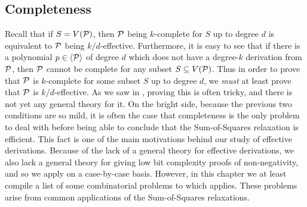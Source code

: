 \subsection{Completeness}
Recall that if $S = V(\mathcal P)$, then $\mathcal P$ being $k$-complete for $S$ up to degree $d$ is equivalent to $\mathcal P$ being $k/d$-effective. Furthermore, it is easy to see that if there is a polynomial $p \in \langle \mathcal P \rangle$ of degree $d$ which does not have a degree-$k$ derivation from $\mathcal P$, then $\mathcal P$ cannot be complete for any subset $S \subseteq V(\mathcal P)$. Thus in order to prove that $\mathcal P$ is $k$-complete for some subset $S$ up to degree $d$, we \emph{must} at least prove that $\mathcal P$ is $k/d$-effective. As we saw in , proving this is often tricky, and there is not yet any general theory for it. On the bright side, because the previous two conditions are so mild, it is often the case that completeness is the only problem to deal with before being able to conclude that the Sum-of-Squares relaxation is efficient. This fact is one of the main motivations behind our study of effective derivations. Because of the lack of a general theory for effective derivations, we also lack a general theory for giving low bit complexity proofs of non-negativity, and so we apply  on a case-by-case basis. However, in this chapter we at least compile a list of some combinatorial problems to which  applies. These problems arise from common applications of the Sum-of-Squares relaxations.

